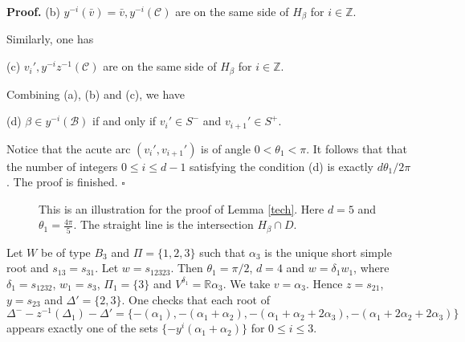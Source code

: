 \documentclass[10pt,leqno]{article}
\newcommand{\qed}{\hfill $\square$ \medskip}
\newenvironment{proof}[1][Proof]{\noindent\textbf{#1.} }{\qed}
\newcommand{\caC}{\mathcal C}
\renewcommand{\a}{\mathfrak a}
\def\le{\leqslant}
\def\a{\alpha}
\def\b{\beta}
\def\d{\delta}
\def\th{\theta}
\def\i{^{-1}}
\begin{document}
\begin{proof}
\noindent(b) $y^{-i}(\bar v)=\bar v, y^{-i}(\caC)$ are on the same side of $H_\b$ for $i \in \mathbb Z$.

Similarly, one has

\noindent(c) $v_i', y^{-i} z^{-1}(\caC)$ are on the same side of $H_\b$ for $i \in \mathbb Z$.

Combining (a), (b) and (c), we have

\noindent(d) $\b \in y^{-i}(\mathcal B)$ if and only if $v_i' \in S^-$ and $v_{i+1}' \in S^+$.

Notice that the acute arc $(v_i', v_{i+1}')$ is of angle $0 < \th_1 < \pi$. It follows that that the number of integers $0 \le i \le d-1$ satisfying the condition (d) is exactly $d\th_1/2\pi$. The proof is finished.
\end{proof}

\begin{figure}
\center
{}

\caption{This is an illustration for the proof of Lemma \ref{tech}. Here $d=5$ and $\th_1 = \frac{4\pi}{5}$. The straight line is the intersection $H_\b \cap D$.}
\end{figure}

\begin{exampleplain}
  Let $W$ be of type $B_3$ and $\Pi=\{1, 2, 3\}$ such that $\a_3$ is the unique short simple root and $s_{13} = s_{31}$. Let $w=s_{12323}$. Then $\th_1 = \pi/2$, $d = 4$ and $w = \d_1 w_1$, where $\d_1 = s_{1232}$, $w_1 = s_3$, $\Pi_1=\{3\}$ and $V^{\d_1} = \mathbb R \a_3$. We take $v = \a_3$. Hence $z = s_{21}$, $y = s_{23}$ and $\Delta'=\{2, 3\}$. One checks that each root of $\Delta^- - z\i(\Delta_{1}) - \Delta'=\{-(\a_1), -(\a_1+\a_2), -(\a_1+\a_2+2 \a_3), -(\a_1+2 \a_2+2 \a_3)\}$ appears exactly one of the sets $\{-y^i(\a_1+\a_2)\}$ for $0 \le i \le 3$.
\end{exampleplain}
\end{document}
